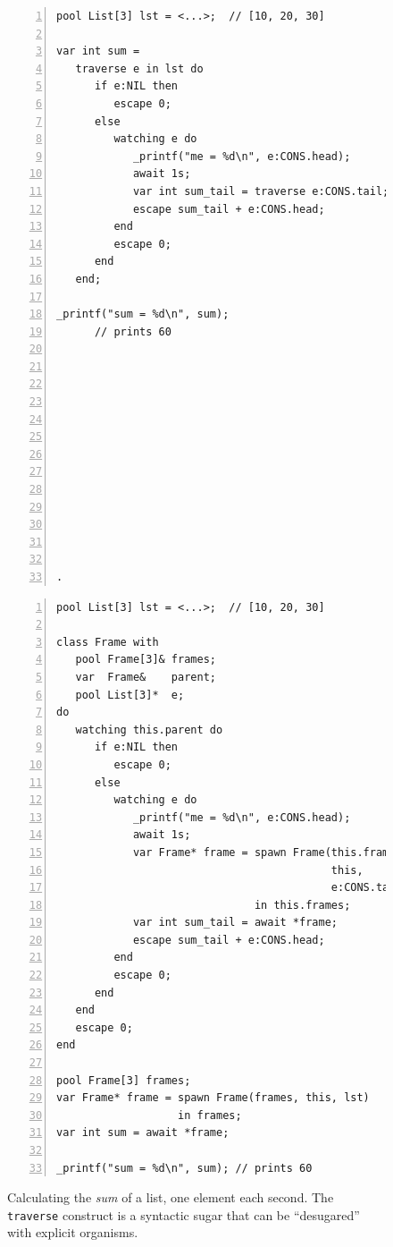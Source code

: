 \documentclass{sig-alternate}
\newcommand{\code}[1] {{\small{\texttt{#1}}}}
\begin{document}
\begin{figure}[t]
\begin{minipage}[t]{0.48\linewidth}
\begin{lstlisting}[numbers=left,xleftmargin=3.5em,title=CODE-1: Original code (with \code{traverse})]
pool List[3] lst = <...>;  // [10, 20, 30]

var int sum =
   traverse e in lst do
      if e:NIL then
         escape 0;
      else
         watching e do
            _printf("me = %d\n", e:CONS.head);
            await 1s;
            var int sum_tail = traverse e:CONS.tail;
            escape sum_tail + e:CONS.head;
         end
         escape 0;
      end
   end;

_printf("sum = %d\n", sum);
      // prints 60













.
\end{lstlisting}
\end{minipage}
%
\begin{minipage}[t]{0.52\linewidth}
\begin{lstlisting}[numbers=left,xleftmargin=3.5em,title=CODE-2: Expanded code (without \code{traverse})]
pool List[3] lst = <...>;  // [10, 20, 30]

class Frame with
   pool Frame[3]& frames;
   var  Frame&    parent;
   pool List[3]*  e;
do
   watching this.parent do
      if e:NIL then
         escape 0;
      else
         watching e do
            _printf("me = %d\n", e:CONS.head);
            await 1s;
            var Frame* frame = spawn Frame(this.frames,
                                           this,
                                           e:CONS.tail);
                               in this.frames;
            var int sum_tail = await *frame;
            escape sum_tail + e:CONS.head;
         end
         escape 0;
      end
   end
   escape 0;
end

pool Frame[3] frames;
var Frame* frame = spawn Frame(frames, this, lst)
                   in frames;
var int sum = await *frame;

_printf("sum = %d\n", sum); // prints 60
\end{lstlisting}
\end{minipage}
%
\caption{
Calculating the \emph{sum} of a list, one element each second.
The \code{traverse} construct is a syntactic sugar that can be ``desugared'' 
with explicit organisms.
\label{lst.list.sum.react}
}
\end{figure}
\end{document}
